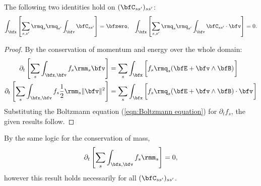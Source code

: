     \line
    
    \begin{lemma}\label{lem:conservation on collision operators}
        The following two identities hold on $(\bfC_{ss'})_{ss'}$:
        \begin{align}
            \int_{\bfx}\left[\sum_{s, s'}\rmq_{s}\rmq_{s'}\int_{\bfv}\bfC_{ss'}\right]           =  \bfzero,  &&
            \int_{\bfx}\left[\sum_{s, s'}\rmq_{s}\rmq_{s'}\int_{\bfv}\bfC_{ss'}\cdot\bfv\right]  =  0.
        \end{align}
    \end{lemma}
    \begin{proof}
        By the conservation of momentum and energy over the whole domain:
        \begin{align}
            \partial_{t}\left[\sum_{s}\int_{\bfx, \bfv}f_{s}\rmm_{s}\bfv\right]                     &=  \sum_{s}\int_{\bfx}\left[f_{s}\rmq_{s}(\bfE + \bfv\wedge\bfB)\tall\right]  \\
            \partial_{t}\left[\sum_{s}\int_{\bfx, \bfv}f_{s}\frac{1}{2}\rmm_{s}\|\bfv\|^{2}\right]  &=  \sum_{s}\int_{\bfx}\left[f_{s}\rmq_{s}(\bfE + \bfv\wedge\bfB)\cdot\bfv\tall\right]
        \end{align}
        Substituting the Boltzmann equation (\ref{eqn:Boltzmann equation}) for $\partial_{t}f_{s}$, the given results follow.

    \end{proof}
    
    \begin{remark}
        By the same logic for the conservation of mass,
        \begin{equation}
            \partial_{t}\left[\sum_{s}\int_{\bfx, \bfv}f_{s}\rmm_{s}\right]  =  0,
        \end{equation}
        however this result holds necessarily for all $(\bfC_{ss'})_{ss'}$.
    \end{remark}

    \line


    
    
